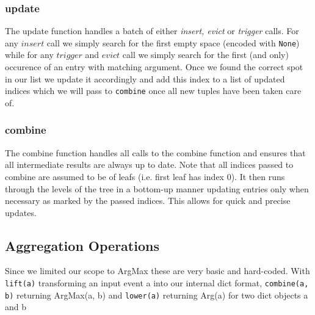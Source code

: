 \subsubsection{update}
The update function handles a batch of either \textit{insert, evict} or \textit{trigger}
calls. For any $insert$ call we simply search for the first empty space
(encoded with \texttt{None})
while for any $trigger$ and $evict$ call we simply search for the first (and only) occurence of
an entry with matching argument. Once we found the correct spot in our list we
update it accordingly and add this index to a list of updated indices which we will
pass to \texttt{combine} once all new tuples have been taken care of.


\subsubsection{combine}
The combine function handles all calls to the combine function and ensures that all
intermediate results are always up to date. Note that all indices passed to combine
are assumed to be of leafs (i.e. first leaf has index 0). It then runs through the
levels of the tree in a bottom-up manner updating entries only when necessary as
marked by the passed indices. This allows for quick and precise updates.

\subsection{Aggregation Operations}
Since we limited our scope to ArgMax these are very basic and hard-coded. With \texttt{lift(a)}
transforming an input event a into our internal dict format, \texttt{combine(a, b)} returning ArgMax(a, b)
and \texttt{lower(a)} returning Arg(a) for two dict objects a and b
